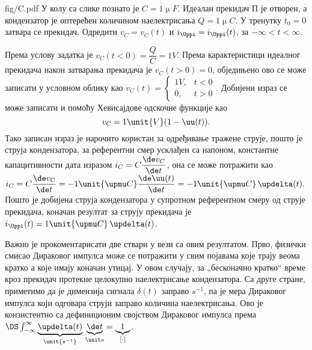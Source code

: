 \noindent\mnImportant
\begin{slikaDesno}[1]{fig/C.pdf}\noindent
\PID \label{ID:capID}
У колу са слике познато је 
$C = 1 \unit{\upmu F}$. 
Идеалан прекидач П је отворен, а кондензатор је оптерећен количином
наелектрисања $Q = 1 \unit{\upmu C}$. У тренутку $t_0 = 0$ затвара се прекидач. 
Одредити $v_{C} = v_{C}(t)$        
и $i_{\Uppi} = i_{\Uppi}(t)$, за $-\infty < t < \infty$. 
\end{slikaDesno}

\REZULTAT 
Према услову задатка је 
\vspace{1mm}
$v_C(t < 0) = \dfrac{Q}{C} = 1\unit{V}$. Према карактеристици идеалног прекидача
након затварања прекидача је $v_C(t > 0) = 0$, обједињено ово се може записати у условном облику као 
$
v_C(t) = 
\begin{cases}
        1\unit{V},&  t < 0 \\
        0,        &  t > 0
\end{cases}.
$ Добијени израз се може записати и помоћу Хевисајдове одскочне функције као 
\begin{equation}
v_{\rm C} = 1\unit{V} ( 1 - \uu(t) ). 
\end{equation}
Тако записан израз је нарочито користан за одређивање тражене струје, пошто је струја кондензатора, 
за референтни смер усклађен са напоном, 
константне капацитивности дата изразом $i_C = C\dfrac{\de v_C}{\de t}$, она се може потражити као
$
i_C = C \dfrac{\de v_{\rm C}}{\de t} = - 1\unit{\upmu C} \dfrac{\de \uu(t)}{\de t}  = 
- 1\unit{\upmu C} \, \updelta(t). 
$
Пошто је добијена струја кондензатора у супротном референтном смеру од струје прекидача, коначан 
резултат за струју прекидача је 
$i_{\Uppi}(t) = 1\unit{\upmu C} \, \updelta(t)$.

Важно је прокоментарисати две ствари у вези са овим резултатом. Прво, физички смисао Дираковог импулса може
се потражити у свим појавама које трају веома кратко а које имају коначан утицај. У овом случају, 
за „бесконачно кратко“ време кроз прекидач протекне целокупно наелектрисање кондензатора. Са друге 
стране, приметимо да је димензија сигнала $\delta(t)$ заправо $\unit{s^{-1}}$, па је мера Дираковог импулса
који одговара струји заправо количина наелектрисања. Ово је конзистентно са дефиниционим својством
Дираковог импулса према $\DS \int_{-\infty}^{\infty} 
\underbrace{\updelta(t)}_{\unit{s^{-1}}} \, 
\underbrace{\de t}_{\unit s} = \underbrace{1}_{[\cdot]}$.